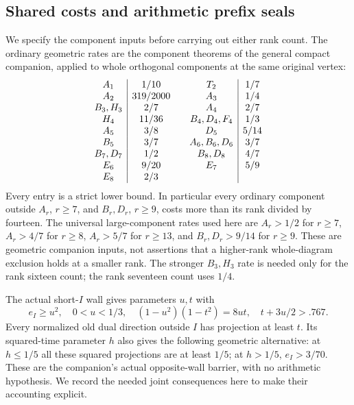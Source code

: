 \documentclass[11pt]{article}
\begin{document}
\subsection{Shared costs and arithmetic prefix seals}\label{subsec:shared-seals}

We specify the component inputs before carrying out either rank count.
The ordinary geometric rates are the component theorems of the general
compact companion, applied to whole orthogonal components at the same
original vertex:
\[
\begin{array}{c|c@{\qquad}c|c}
A_1&1/10&T_2&1/7\\
A_2&319/2000&A_3&1/4\\
B_3,H_3&2/7&A_4&2/7\\
H_4&11/36&B_4,D_4,F_4&1/3\\
A_5&3/8&D_5&5/14\\
B_5&3/7&A_6,B_6,D_6&3/7\\
B_7,D_7&1/2&B_8,D_8&4/7\\
E_6&9/20&E_7&5/9\\
E_8&2/3&&
\end{array}
\]
Every entry is a strict lower bound. In particular every ordinary
component outside $A_r$, $r\ge7$, and $B_r,D_r$, $r\ge9$, costs
more than its rank divided by fourteen. The universal large-component
rates used here are $A_r>1/2$ for $r\ge7$, $A_r>4/7$ for $r\ge8$,
$A_r>5/7$ for $r\ge13$, and $B_r,D_r>9/14$ for $r\ge9$.
These are geometric companion inputs, not assertions that a higher-rank
whole-diagram exclusion holds at a smaller rank. The stronger $B_3,H_3$
rate is needed only for the rank sixteen count; the rank seventeen count uses $1/4$.

The actual short-$I$ wall gives parameters $u,t$ with
\begin{equation}\label{eq:Ibarrier}
 e_I\ge u^2,\quad0<u<1/3,\quad
 (1-u^2)(1-t^2)=8ut,\quad t+3u/2>.767.
\end{equation}
Every normalized old dual direction outside $I$ has projection at
least $t$. Its squared-time parameter $h$ also gives the following
geometric alternative: at $h\le1/5$ all these squared projections are
at least $1/5$; at $h>1/5$, $e_I>3/70$.
These are the companion's actual opposite-wall barrier, with no
arithmetic hypothesis. We record the needed joint consequences here
to make their accounting explicit.
\end{document}
